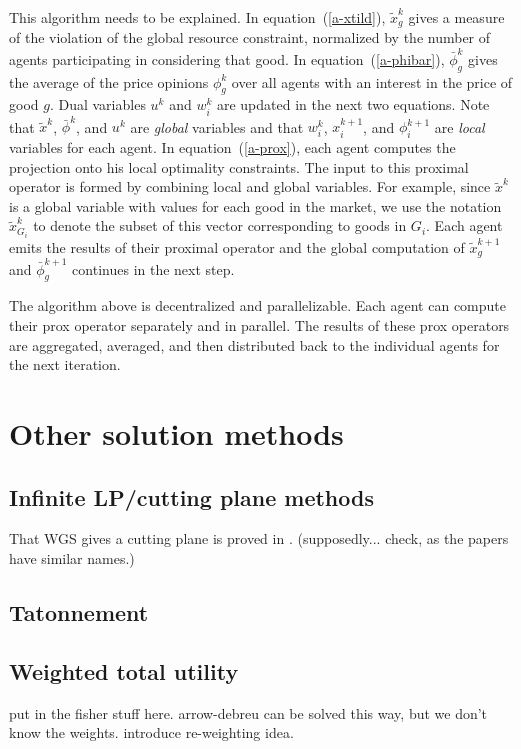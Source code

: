 \documentclass[12pt]{article}
\begin{document}
This algorithm needs to be explained.
In equation~(\ref{a-xtild}), $\tilde{x}^k_g$ gives a measure of the violation of
the global resource constraint, normalized by the number of agents participating
in considering that good.
In equation~(\ref{a-phibar}), $\bar{\phi}^k_g$ gives the average of the price
opinions $\phi^k_g$ over all agents with an interest in the price of good $g$.
Dual variables $u^k$ and $w^k_i$ are updated in the next two equations.
Note that $\tilde{x}^k$, $\bar{\phi}^k$, and $u^k$ are \emph{global} variables
and that $w_i^k$, $x_i^{k+1}$, and $\phi_i^{k+1}$ are \emph{local} variables
for each agent. In equation~(\ref{a-prox}), each agent computes the projection
onto his local optimality constraints.
The input to this proximal operator is formed by combining
local and global variables.
For example, since $\tilde{x}^k$ is a global variable with values for each good in the market, we use the notation $\tilde{x}^k_{G_i}$ to denote the subset of this vector corresponding to goods in $G_i$.
Each agent emits the results of their proximal operator and the
global computation of $\tilde{x}^{k+1}_g$ and $\bar{\phi}^{k+1}_g$ continues in the next step.

The algorithm above is decentralized and parallelizable.
Each agent can compute their prox operator separately and in parallel.
The results of these prox operators are aggregated, averaged, and then distributed
back to the individual agents for the next iteration.



\section{Other solution methods}

\subsection{Infinite LP/cutting plane methods}
That WGS gives a cutting plane is proved in \cite{arrow1959stability}.
(supposedly... check, as the papers have similar names.)

\subsection{Tatonnement}

\subsection{Weighted total utility}
put in the fisher stuff here. arrow-debreu can be solved this way, but we
don't know the weights. introduce re-weighting idea.
\end{document}
